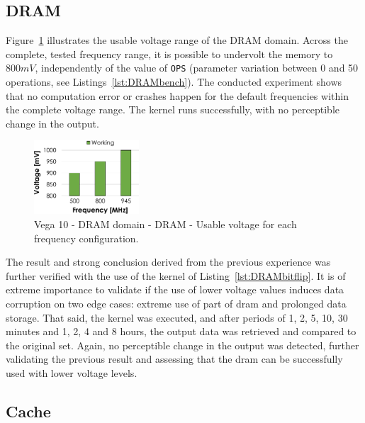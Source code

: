 \subsection{DRAM}

Figure~\ref{fig:DRAM_guardband} illustrates the usable voltage range of the DRAM domain. Across the complete, tested frequency range, it is possible to undervolt the memory to $800mV$, independently of the value of \texttt{OPS} (parameter variation between 0 and 50 operations, see Listings~\ref{lst:DRAMbench}).
The conducted experiment shows that no computation error or crashes happen for the default frequencies within the complete voltage range. The kernel runs successfully, with no perceptible change in the output.


\begin{figure}[htb]
  \centering
  \includegraphics[width=0.35\textwidth]{Figures/GPU_characterization/DRAM_Guardband.pdf}
  \caption{Vega 10 - DRAM domain - DRAM - Usable voltage for each frequency configuration.}
  \label{fig:DRAM_guardband}
\end{figure}

The result and strong conclusion derived from the previous experience was further verified with the use of the kernel of Listing~\ref{lst:DRAMbitflip}. It is of extreme importance to validate if the use of lower voltage values induces data corruption on two edge cases: extreme use of part of \acrshort{dram} and prolonged data storage. That said, the kernel was executed, and after periods of 1, 2, 5, 10, 30 minutes and 1, 2, 4 and 8 hours, the output data was retrieved and compared to the original set. Again, no perceptible change in the output was detected, further validating the previous result and assessing that the \acrshort{dram} can be successfully used with lower voltage levels. 

\subsection{Cache}
\label{sec:cache_guardband}

